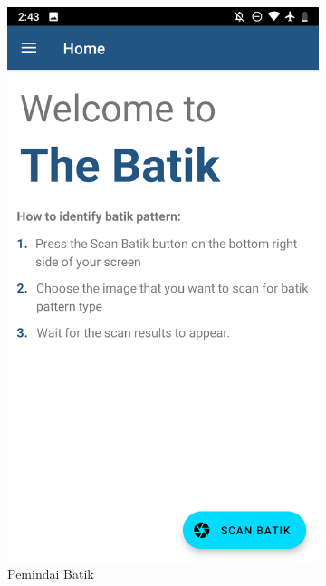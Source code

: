\begin{figure}[hpt!]
\begin{subfigure}[b]{0.3\textwidth}
    \end{subfigure}
    \hfill
    \begin{subfigure}[b]{0.3\textwidth}
      
      \centering
      
      \includegraphics[width=\textwidth]{gambar/dua.png}
      
      \caption{Pemindai Batik}
      
      \label{fig:dua}
    \end{subfigure}
    \hfill
    \begin{subfigure}[b]{0.3\textwidth}
      

\end{subfigure}
\end{figure}
